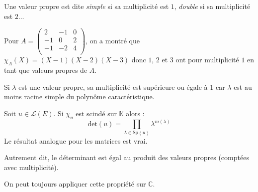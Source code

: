\documentclass[a4paper,10pt]{report}
\begin{document}
 \begin{rem} Une valeur propre est dite \textit{simple} si sa multiplicité est $1$, \textit{double} si sa multiplicité est $2 \ldots$
 \end{rem}

\begin{ex} Pour $A = \begin{pmatrix}
2 & -1 & 0 \\
-1 & 0 & 2 \\
-1 & -2 & 4 \\
\end{pmatrix}$, on a montré que $\chi_A(X) = (X-1)(X-2)(X-3)$ donc $1$, $2$ et $3$ ont pour multiplicité $1$ en tant que valeurs propres de $A$.
\end{ex}

\medskip

\begin{rem} Si $\lambda$ est une valeur propre, sa multiplicité est supérieure ou égale à $1$ car $\lambda$ est au moins racine simple du polynôme caractéristique.
\end{rem}

\medskip

\begin{prop} Soit $u \in \mathcal{L}(E)$. Si $\chi_u$ est scindé sur $\mathbb{K}$ alors :
$$ \textrm{det}(u) = \prod_{\lambda \in \textrm{Sp}(u)} \lambda^{m(\lambda)} $$
Le résultat analogue pour les matrices est vrai.
\end{prop}

\noindent Autrement dit, le déterminant est égal au produit des valeurs propres (comptées avec multiplicité).

\medskip

\begin{preuve} 

\vspace{5cm}
\end{preuve}

\begin{rem} On peut toujours appliquer cette propriété sur $\mathbb{C}$.
\end{rem}
\end{document}
